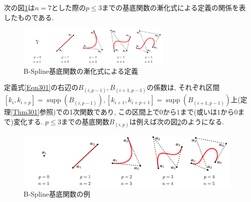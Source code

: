 \documentclass{jsarticle}
\newcommand\setR{\mathbb{R}}
\newcommand\squa[1]{[#1]}
\DeclareMathOperator{\supp}{supp}
\theoremstyle{definition}%
\begin{document}
次の図\ref{Fig301}は$n=7$とした際の$p\leq 3$までの基底関数の漸化式による定義の関係を表したものである.
\begin{figure}[H]
	\centering
    \includegraphics[page=8,clip,width=75mm]{fig.pdf}
	\caption{B-Spline基底関数の漸化式による定義}
	\label{Fig301}
\end{figure}
\noindent
定義式\eqref{Eqn301}の右辺の$B_{(i,p-1)},B_{(i+1,p-1)}$の係数は, それぞれ区間$\squa{k_{i},k_{i+p}}=\supp(B_{(i,p-1)}), \squa{k_{i+1},k_{i+p+1}}=\supp(B_{(i+1,p-1)})$上(定理\ref{Thm301}参照)での1次関数であり, この区間上で$0$から$1$まで(或いは$1$から$0$まで)変化する.
$p\leq 3$までの基底関数$B_{(i,p)}$は例えば次の図\ref{Fig302}のようになる.
\addtocounter{footnote}{-1}
\begin{figure}[H]
	\centering
    \includegraphics[page=9,clip,width=111mm]{fig.pdf}
	\caption{B-Spline基底関数の例\protect\footnotemark}
	\label{Fig302}
\end{figure}
\end{document}
